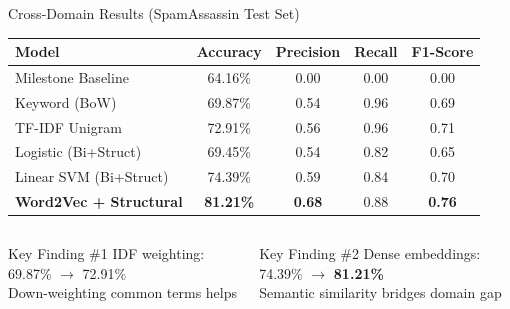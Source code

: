 \documentclass[aspectratio=169, 12pt]{beamer}
\begin{document}
\begin{frame}{Cross-Domain Results (SpamAssassin Test Set)}
\centering
\vspace{-2pt}

\begin{tabular}{@{}lcccc@{}}
\toprule
\textbf{Model} & \textbf{Accuracy} & \textbf{Precision} & \textbf{Recall} & \textbf{F1-Score} \\ \midrule
{\color{textMuted}Milestone Baseline} & {\color{textMuted}64.16\%} & {\color{textMuted}0.00} & {\color{textMuted}0.00} & {\color{textMuted}0.00} \\[2pt]
Keyword (BoW) & 69.87\% & 0.54 & \textcolor{accentOrange}{0.96} & 0.69 \\
TF-IDF Unigram & 72.91\% & 0.56 & \textcolor{accentOrange}{0.96} & 0.71 \\
Logistic (Bi+Struct) & 69.45\% & 0.54 & 0.82 & 0.65 \\
Linear SVM (Bi+Struct) & 74.39\% & 0.59 & 0.84 & 0.70 \\[2pt]
\rowcolor{cardBg}
\textcolor{accentGreen}{\textbf{Word2Vec + Structural}} & \textcolor{accentGreen}{\textbf{81.21\%}} & \textcolor{accentGreen}{\textbf{0.68}} & \textcolor{accentGreen}{0.88} & \textcolor{accentGreen}{\textbf{0.76}} \\
\bottomrule
\end{tabular}

\vspace{12pt}
\begin{columns}[T]
\begin{block}{\small Key Finding \#1}
\small IDF weighting: 69.87\% $\rightarrow$ 72.91\%\\
{\scriptsize Down-weighting common terms helps}
\end{block}

\begin{block}{\small Key Finding \#2}
\small Dense embeddings: 74.39\% $\rightarrow$ \textbf{81.21\%}\\
{\scriptsize Semantic similarity bridges domain gap}
\end{block}
\end{columns}
\end{frame}
\end{document}
